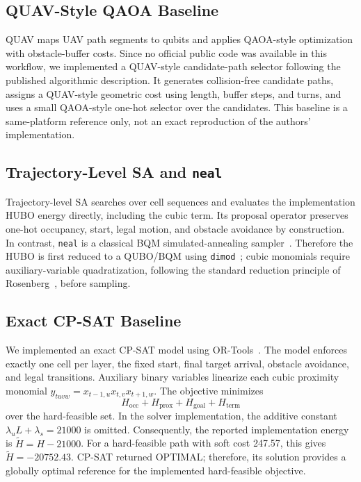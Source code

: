 \documentclass[letterpaper]{article} %
\begin{document}
\subsection{QUAV-Style QAOA Baseline}
QUAV maps UAV path segments to qubits and applies QAOA-style optimization with obstacle-buffer costs. Since no official public code was available in this workflow, we implemented a QUAV-style candidate-path selector following the published algorithmic description. It generates collision-free candidate paths, assigns a QUAV-style geometric cost using length, buffer steps, and turns, and uses a small QAOA-style one-hot selector over the candidates. This baseline is a same-platform reference only, not an exact reproduction of the authors' implementation.

\subsection{Trajectory-Level SA and \texttt{neal}}
Trajectory-level SA searches over cell sequences and evaluates the implementation HUBO energy directly, including the cubic term. Its proposal operator preserves one-hot occupancy, start, legal motion, and obstacle avoidance by construction. In contrast, \texttt{neal} is a classical BQM simulated-annealing sampler~\cite{neal}. Therefore the HUBO is first reduced to a QUBO/BQM using \texttt{dimod}~\cite{dimod}; cubic monomials require auxiliary-variable quadratization, following the standard reduction principle of Rosenberg~\cite{rosenberg1975reduction}, before sampling.

\subsection{Exact CP-SAT Baseline}
We implemented an exact CP-SAT model using OR-Tools~\cite{perron2026ortools}. The model enforces exactly one cell per layer, the fixed start, final target arrival, obstacle avoidance, and legal transitions. Auxiliary binary variables linearize each cubic proximity monomial $y_{tuvw}=x_{t-1,u}x_{t,v}x_{t+1,w}$. The objective minimizes
\begin{equation}
H_{\mathrm{occ}}+H_{\mathrm{prox}}+H_{\mathrm{goal}}+H_{\mathrm{term}}
\end{equation}
over the hard-feasible set. In the solver implementation, the additive constant $\lambda_uL+\lambda_s=21000$ is omitted. Consequently, the reported implementation energy is $\widetilde{H}=H-21000$. For a hard-feasible path with soft cost 247.57, this gives $\widetilde{H}=-20752.43$. CP-SAT returned OPTIMAL; therefore, its solution provides a globally optimal reference for the implemented hard-feasible objective.
\end{document}
